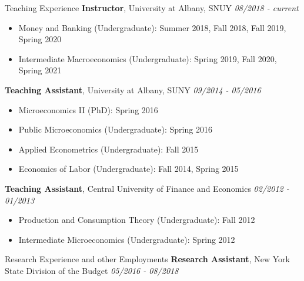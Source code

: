 \documentclass{resume_liang} %
\begin{document}
\begin{rSection}{Teaching Experience}
{\bf Instructor}{, University at Albany, SNUY} \hfill {\em 08/2018 - current}
 \begin{itemize}
     \item[] Money and Banking (Undergraduate): Summer 2018, Fall 2018, Fall 2019, Spring 2020
     \item[] Intermediate Macroeconomics (Undergraduate): Spring 2019, Fall 2020, Spring 2021
 \end{itemize} 
{\bf Teaching Assistant}{, University at Albany, SUNY} \hfill {\em 09/2014 - 05/2016}
   \begin{itemize}
     \item[] Microeconomics II (PhD): Spring 2016
     \item[] Public Microeconomics (Undergraduate): Spring 2016
     \item[] Applied Econometrics (Undergraduate): Fall 2015
     \item[] Economics of Labor (Undergraduate): Fall 2014, Spring 2015
   \end{itemize} 
{\bf Teaching Assistant}{, Central University of Finance and Economics} \hfill {\em 02/2012 - 01/2013}
\begin{itemize}
	\item[] Production and Consumption Theory (Undergraduate): Fall 2012
	\item[] Intermediate Microeconomics (Undergraduate): Spring 2012 
\end{itemize} 
\end{rSection}
\bigskip \bigskip





\begin{rSection}{Research Experience and other Employments}
	{\bf Research Assistant}{, New York State Division of the Budget} \hfill {\em 05/2016 - 08/2018}
\end{rSection}
\bigskip \bigskip
\end{document}
